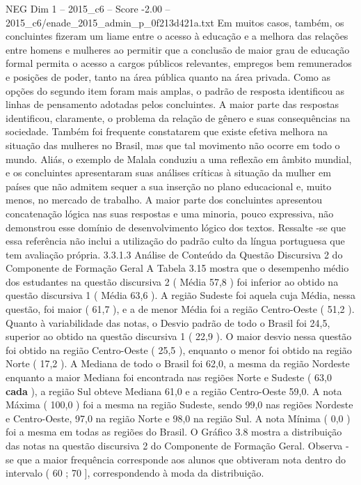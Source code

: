 \begin{textsample}{NEG Dim 1 – 2015\_c6 – Score -2.00 – 2015\_c6/enade\_2015\_admin\_p\_0f213d421a.txt}
Em muitos casos, também, os concluintes fizeram um liame entre o acesso à educação e a melhora das relações entre homens e mulheres ao permitir que a conclusão de maior grau de educação formal permita o acesso a cargos públicos relevantes, empregos bem remunerados e posições de poder, tanto na área pública quanto na área privada.
Como as opções do segundo item foram mais amplas, o padrão de resposta identificou as linhas de pensamento adotadas pelos concluintes.
A maior parte das respostas identificou, claramente, o problema da relação de gênero e suas consequências na sociedade.
Também foi frequente constatarem que existe efetiva melhora na situação das mulheres no Brasil, mas que tal movimento não ocorre em todo o mundo.
Aliás, o exemplo de Malala conduziu a uma reflexão em âmbito mundial, e os concluintes apresentaram suas análises críticas à situação da mulher em países que não admitem sequer a sua inserção no plano educacional e, muito menos, no mercado de trabalho.
A maior parte dos concluintes apresentou concatenação lógica nas suas respostas e uma minoria, pouco expressiva, não demonstrou esse domínio de desenvolvimento lógico dos textos.
Ressalte -se que essa referência não inclui a utilização do padrão culto da língua portuguesa que tem avaliação própria. 3.3.1.3 Análise de Conteúdo da Questão Discursiva 2 do Componente de Formação Geral A Tabela 3.15 mostra que o desempenho médio dos estudantes na questão discursiva 2 ( Média 57,8 ) foi inferior ao obtido na questão discursiva 1 ( Média 63,6 ).
A região Sudeste foi aquela cuja Média, nessa questão, foi maior ( 61,7 ), e a de menor Média foi a região Centro-Oeste ( 51,2 ).
Quanto à variabilidade das notas, o Desvio padrão de todo o Brasil foi 24,5, superior ao obtido na questão discursiva 1 ( 22,9 ).
O maior desvio nessa questão foi obtido na região Centro-Oeste ( 25,5 ), enquanto o menor foi obtido na região Norte ( 17,2 ).
A Mediana de todo o Brasil foi 62,0, a mesma da região Nordeste enquanto a maior Mediana foi encontrada nas regiões Norte e Sudeste ( 63,0 \textbf{cada} ), a região Sul obteve Mediana 61,0 e a região Centro-Oeste 59,0.
A nota Máxima ( 100,0 ) foi a mesma na região Sudeste, sendo 99,0 nas regiões Nordeste e Centro-Oeste, 97,0 na região Norte e 98,0 na região Sul.
A nota Mínima ( 0,0 ) foi a mesma em todas as regiões do Brasil.
O Gráfico 3.8 mostra a distribuição das notas na questão discursiva 2 do Componente de Formação Geral.
Observa -se que a maior frequência corresponde aos alunos que obtiveram nota dentro do intervalo ( 60 ; 70 ], correspondendo à moda da distribuição.

\end{textsample}
